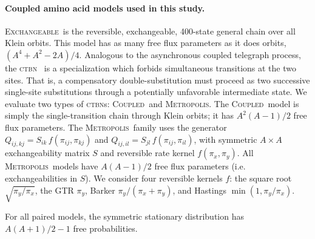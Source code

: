 \documentclass{article}
\newcommand{\CTBN}{\textsc{ctbn}}
\newcommand{\Coupledm}{\textsc{Coupled}}
\newcommand{\Exchm}{\textsc{Exchangeable}}
\newcommand{\Metrop}{\textsc{Metropolis}}
\begin{document}
\paragraph{Coupled amino acid models used in this study.}  \Exchm\ is the reversible, 
exchangeable, 400-state general chain over all Klein orbits. This model has as many free 
flux parameters as it does orbits, $(A^4+A^2-2A)/4$.
Analogous to the asynchronous coupled telegraph process, the \CTBN~\cite{cohn2010,nodelman2002} is a specialization which forbids 
simultaneous transitions at the two sites. 
That is, a compensatory double-substitution must proceed as two successive 
single-site substitutions through a potentially unfavorable intermediate state.
We evaluate two types of \CTBN s: \Coupledm\ and \Metrop. The \Coupledm\ 
model is simply the single-transition chain through Klein orbits; it has $A^2(A-1) / 2$
free flux parameters. 
The \Metrop\ family uses the generator
$Q_{ij,kj}=S_{ik}\,f(\pi_{ij},\pi_{kj})$ and $Q_{ij,il}=S_{jl}\,f(\pi_{ij},\pi_{il})$, with 
symmetric $A\times A$ exchangeability matrix $S$ and reversible rate kernel $f(\pi_x,\pi_y)$. 
All \Metrop\ models have $A(A-1) / 2$ free flux parameters (i.e. exchangeabilities in $S$).
We consider four reversible kernels 
$f$:  the square root $\sqrt{\pi_y/\pi_x}$, the GTR $\pi_y$, Barker $\pi_y/(\pi_x{+}\pi_y)$, and 
Hastings $\min(1,\pi_y/\pi_x)$. 

For all paired models, the symmetric stationary distribution has $A(A{+}1)/2-1$ 
free probabilities.

\end{document}
